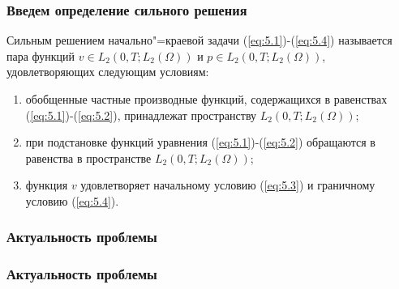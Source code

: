 \documentclass[10pt, pdf, hyperref={unicode}]{beamer}
\begin{document}
    \begin{frame}
        \frametitle{Введем определение сильного решения}
        \begin{center}
            \begin{minipage}[h]{0.97\linewidth}
\begin{definition}
    Сильным решением начально"=краевой задачи (\ref{eq:5.1})-(\ref{eq:5.4}) называется пара функций $v\in L_2(0, T; L_2(\Omega))$ и
    $p\in L_2(0, T; L_2(\Omega))$, удовлетворяющих следующим условиям:
\end{definition}

\begin{enumerate} 
    \item обобщенные частные производные функций, содержащихся в равенствах (\ref{eq:5.1})-(\ref{eq:5.2}), принадлежат пространству $L_2(0, T; L_2(\Omega))$;
    \item при подстановке функций уравнения (\ref{eq:5.1})-(\ref{eq:5.2}) обращаются в равенства в пространстве $L_2(0, T; L_2(\Omega))$;
    \item функция $v$ удовлетворяет начальному условию (\ref{eq:5.3}) и граничному условию (\ref{eq:5.4}).
\end{enumerate}
            \end{minipage}
        \end{center}
    \end{frame}

    \begin{frame}
        \frametitle{Актуальность проблемы}
        \begin{center}
            \begin{minipage}[h]{0.97\linewidth}

            \end{minipage}
        \end{center}
    \end{frame}

    \begin{frame}
        \frametitle{Актуальность проблемы}
        \begin{center}
            \begin{minipage}[h]{0.97\linewidth}

            \end{minipage}
        \end{center}
    \end{frame}
\end{document}
